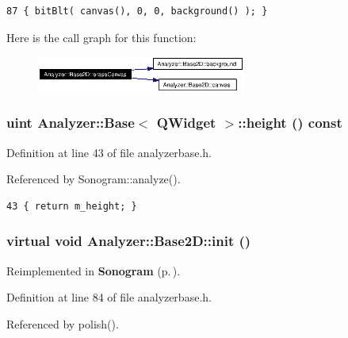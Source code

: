 \footnotesize\begin{verbatim}87 { bitBlt( canvas(), 0, 0, background() ); }
\end{verbatim}\normalsize 


Here is the call graph for this function:\begin{figure}[H]
\begin{center}
\leavevmode
\includegraphics[width=195pt]{classAnalyzer_1_1Base2D_Sonogramb1_cgraph}
\end{center}
\end{figure}
\subsubsection{\setlength{\rightskip}{0pt plus 5cm}uint {\bf Analyzer::Base}$<$ {\bf QWidget}  $>$::height () const\hspace{0.3cm}{\tt  [inline, inherited]}}\label{classAnalyzer_1_1Base_Analyzer_1_1Basea1}




Definition at line 43 of file analyzerbase.h.

Referenced by Sonogram::analyze().



\footnotesize\begin{verbatim}43 { return m_height; }
\end{verbatim}\normalsize 
{}
\subsubsection{\setlength{\rightskip}{0pt plus 5cm}virtual void Analyzer::Base2D::init ()\hspace{0.3cm}{\tt  [inline, protected, virtual]}}\label{classAnalyzer_1_1Base2D_Analyzer_1_1Base2Db1}




Reimplemented in {\bf Sonogram} {\rm (p.\,\pageref{classSonogram_Sonograma2})}.

Definition at line 84 of file analyzerbase.h.

Referenced by polish().




